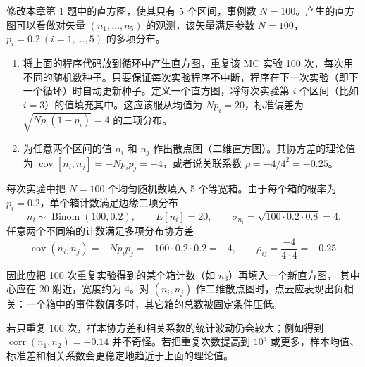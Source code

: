 \begin{question}
修改本章第 1 题中的直方图，使其只有 5 个区间，事例数
\(N=100\)。产生的直方图可以看做对矢量 \((n_1,\ldots,n_5)\)
的观测，该矢量满足参数 \(N=100\)，\(p_i=0.2\ (i=1,\ldots,5)\)
的多项分布。

\begin{enumerate}
\item
  将上面的程序代码放到循环中产生直方图，重复该 MC 实验 100
  次，每次用不同的随机数种子。只要保证每次实验程序不中断，程序在下一次实验（即下一个循环）时自动更新种子。定义一个直方图，将每次实验第
  \(i\) 个区间（比如 \(i=3\)）的值填充其中。这应该服从均值为
  \(Np_i=20\)，标准偏差为 \(\sqrt{Np_i(1-p_i)}=4\) 的二项分布。
\item
  为任意两个区间的值 \(n_i\) 和 \(n_j\)
  作出散点图（二维直方图）。其协方差的理论值为
  \(\operatorname{cov}[n_i,n_j]=-Np_ip_j=-4\)，或者说关联系数
  \(\rho=-4/4^2=-0.25\)。
\end{enumerate}
\begin{solution}
每次实验中把 \(N=100\) 个均匀随机数填入 5 个等宽箱。由于每个箱的概率为
\(p_i=0.2\)，单个箱计数满足边缘二项分布
\[
n_i\sim\operatorname{Binom}(100,0.2),
\qquad
E[n_i]=20,
\qquad
\sigma_{n_i}=\sqrt{100\cdot0.2\cdot0.8}=4.
\]
任意两个不同箱的计数满足多项分布协方差
\[
\operatorname{cov}(n_i,n_j)=-Np_ip_j=-100\cdot0.2\cdot0.2=-4,
\qquad
\rho_{ij}=\frac{-4}{4\cdot4}=-0.25.
\]

因此应把 100 次重复实验得到的某个箱计数（如 \(n_3\)）再填入一个新直方图，
其中心应在 20 附近，宽度约为 4。对 \((n_i,n_j)\) 作二维散点图时，点云应表现出负相关：一个箱中的事件数偏多时，其它箱的总数被固定条件压低。

若只重复 100 次，样本协方差和相关系数的统计波动仍会较大；例如得到
\(\operatorname{corr}(n_1,n_2)=-0.14\) 并不奇怪。若把重复次数提高到
\(10^4\) 或更多，样本均值、标准差和相关系数会更稳定地趋近于上面的理论值。
\end{solution}
\end{question}



